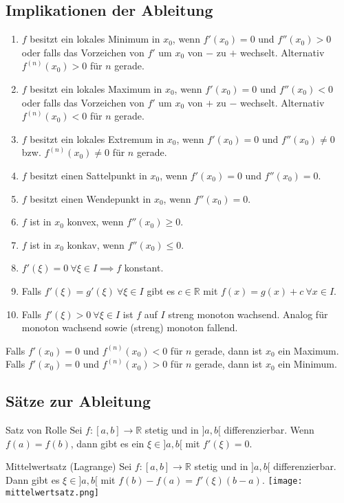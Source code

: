\documentclass[a4paper,10pt]{article}
\def\R{\mathbb{R}}
\begin{document}
\subsection{Implikationen der Ableitung}
\begin{enumerate}
  \item $f$ besitzt ein lokales Minimum in $x_0$, wenn $f'(x_0) = 0$ und $f''(x_0) > 0$ oder falls das Vorzeichen von $f'$ um $x_0$ von $-$ zu $+$ wechselt. Alternativ $f^{(n)}(x_0) > 0$ für $n$ gerade.
  \item $f$ besitzt ein lokales Maximum in $x_0$, wenn $f'(x_0) = 0$ und $f''(x_0) < 0$ oder falls das Vorzeichen von $f'$ um $x_0$ von $+$ zu $-$ wechselt. Alternativ $f^{(n)}(x_0) < 0$ für $n$ gerade.
  \item $f$ besitzt ein lokales Extremum in $x_0$, wenn $f'(x_0) = 0$ und $f''(x_0) \ne 0$ bzw. $f^{(n)}(x_0) \neq 0$ für $n$ gerade.
  \item $f$ besitzt einen Sattelpunkt in $x_0$, wenn $f'(x_0) = 0$ und $f''(x_0) = 0$.
  \item $f$ besitzt einen Wendepunkt in $x_0$, wenn $f''(x_0) = 0$.
  \item $f$ ist in $x_0$ konvex, wenn $f''(x_0) \ge 0$.
  \item $f$ ist in $x_0$ konkav, wenn $f''(x_0) \le 0$.
  \item $f'(\xi) = 0 \ \forall \xi \in I \implies f$ konstant.
  \item Falls $f'(\xi) = g'(\xi) \ \forall \xi \in I$ gibt es $c \in \mathbb{R}$ mit $f(x) = g(x) + c \ \forall x \in I$.
  \item Falls $f'(\xi) > 0 \ \forall \xi \in I$ ist $f$ auf $I$ streng monoton wachsend. Analog für monoton wachsend sowie (streng) monoton fallend.
\end{enumerate}

Falls $f'(x_0) = 0$ und $f^{(n)}(x_0) < 0$ für $n$ gerade, dann ist $x_0$ ein Maximum.\\
Falls $f'(x_0) = 0$ und $f^{(n)}(x_0) > 0$ für $n$ gerade, dann ist $x_0$ ein Minimum.

\subsection{Sätze zur Ableitung}
\begin{subbox}{Satz von Rolle}
 Sei $f: [a,b] \to \R$ stetig und in $]a,b[$ differenzierbar. Wenn $f(a) = f(b)$, dann gibt es ein $\xi \in ]a,b[$ mit $f'(\xi) = 0$.
\end{subbox}
\begin{mainbox}{Mittelwertsatz (Lagrange)}
 Sei $f: [a,b] \to \R$ stetig und in $]a,b[$ differenzierbar. Dann gibt es $\xi \in ]a,b[$ mit $f(b) - f(a) = f'(\xi)(b-a)$.
 \texttt{[image: mittelwertsatz.png]}
\end{mainbox}
\end{document}
